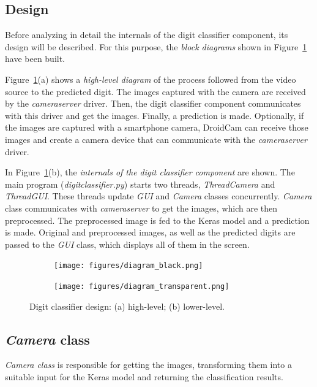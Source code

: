\subsection{Design}
Before analyzing in detail the internals of the digit classifier component, its design will be described. For this purpose, the \emph{block diagrams} shown in Figure~\ref{fig:dia} have been built.

Figure~\ref{fig:dia}(a) shows a \emph{high-level diagram} of the process followed from the video source to the predicted digit. The images captured with the camera are received by the \emph{cameraserver} driver. Then, the digit classifier component communicates with this driver and get the images. Finally, a prediction is made. Optionally, if the images are captured with a smartphone camera, DroidCam can receive those images and create a camera device that can communicate with the \emph{cameraserver} driver.

In Figure~\ref{fig:dia}(b), the  \emph{internals of the digit classifier component} are shown. The main program (\emph{digitclassifier.py}) starts two threads, \textit{ThreadCamera} and \textit{ThreadGUI}. These threads update \textit{GUI} and \textit{Camera} classes concurrently. \textit{Camera} class communicates with \textit{cameraserver} to get the images, which are then preprocessed. The preprocessed image is fed to the Keras model and a prediction is made. Original and preprocessed images, as well as the predicted digits are passed to the \textit{GUI} class, which displays all of them in the screen.
\begin{figure}
	\begin{subfigure}{1\textwidth}
		\centering
		\texttt{[image: figures/diagram\_black.png]}
		\caption{}
	\end{subfigure}
	\begin{subfigure}{1\textwidth}
		\centering
		\texttt{[image: figures/diagram\_transparent.png]}
		\caption{}
	\end{subfigure}
	\caption{Digit classifier design: (a) high-level; (b) lower-level.}
	\label{fig:dia}
\end{figure}

\subsection{\textit{Camera} class}
\emph{\textit{Camera} class} is responsible for getting the images, transforming them into a suitable input for the Keras model and returning the classification results.


